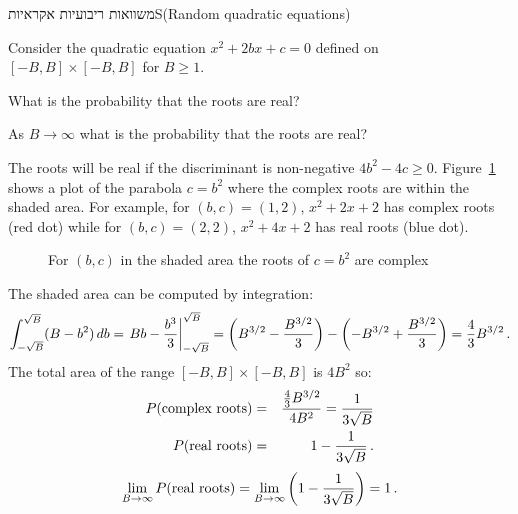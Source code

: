 
\begin{prob}{משוואות ריבועיות אקראיות}{S}{(Random quadratic equations)}

Consider the quadratic equation $x^2+2bx+c=0$ defined on $[-B,B]\times[-B,B]$ for $B\geq 1$.

 What is the probability that the roots are real?

 As $B\rightarrow \infty$ what is the probability that the roots are real?
\end{prob}

\solution{}

The roots will be real if the discriminant is non-negative $4b^2-4c\geq 0$. Figure~\ref{f.real-roots} shows a plot of the parabola $c=b^2$ where the complex roots are within the shaded area. For example, for $(b,c)=(1,2)$, $x^2+2x+2$ has complex roots (red dot) while for $(b,c)=(2,2)$, $x^2+4x+2$ has real roots (blue dot).

\begin{figure}[tb]
\begin{center}
\end{center}
\caption{For $(b,c)$ in the shaded area the roots of $c=b^2$ are complex}\label{f.real-roots}
\end{figure}

The shaded area can be computed by integration:
\[
\int_{-\sqrt{B}}^{\sqrt{B}} (B-b^2)\,db=
\left. Bb-\displaystyle\frac{b^3}{3}\right|_{-\sqrt{B}}^{\sqrt{B}}=
\left(B^{3/2}-\frac{B^{3/2}}{3}\right)-
\left(-B^{3/2}+\frac{B^{3/2}}{3}\right)=
\displaystyle\frac{4}{3}B^{3/2}\,.
\]
The total area of the range $[-B,B]\times[-B,B]$ is $4B^2$ so:
\begin{eqnarray*}
P(\textrm{complex roots})&=&\displaystyle\frac{\frac{4}{3}B^{3/2}}{4B^2}=\displaystyle\frac{1}{3\sqrt{B}}\\
P(\textrm{real roots})&=&1-\displaystyle\frac{1}{3\sqrt{B}}\,.
\end{eqnarray*}
\[
\lim_{B\rightarrow\infty}
P(\textrm{real roots})=
\lim_{B\rightarrow\infty} \left(1-\displaystyle\frac{1}{3\sqrt{B}}\right)=
1\,.
\]

